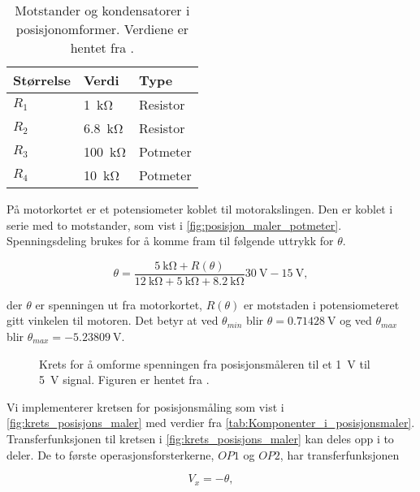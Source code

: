 \begin{table}[h]
    \centering
    \caption{Motstander og kondensatorer i posisjonomformer. Verdiene er hentet fra \cite{AnalogMotorlabbOppgaver}.}
    \begin{tabular}{lll}
        \toprule
        Størrelse & Verdi & Type \\
		\midrule
        $R_1$ & \SI{1}{\kilo\ohm} & Resistor\\
        $R_2$ & \SI{6.8}{\kilo\ohm} & Resistor \\
        $R_3$ & \SI{100}{\kilo\ohm} & Potmeter \\
        $R_4$ & \SI{10}{\kilo\ohm} & Potmeter \\
        \bottomrule
    \end{tabular}
    \label{tab:Komponenter_i_posisjonsmaler}
\end{table}

På motorkortet er et potensiometer koblet til motorakslingen. Den er koblet i serie med to motstander, som vist i \autoref{fig:posisjon_maler_potmeter}. Spenningsdeling brukes for å komme fram til følgende uttrykk for $\theta$.

\begin{equation}
    \label{eq:V_av_theta}
    \theta = \frac{\SI{5}{\kilo\ohm} + R(\theta)}{\SI{12}{\kilo\ohm} + \SI{5}{\kilo\ohm} + \SI{8.2}{\kilo\ohm}} \SI{30}{\volt} - \SI{15}{\volt},
\end{equation}

der $\theta$ er spenningen ut fra motorkortet, $R(\theta)$ er motstaden i potensiometeret gitt vinkelen til motoren. Det betyr at ved $\theta_{min}$ blir $\theta = \SI{0.71428}{\volt}$ og ved $\theta_{max}$ blir $\theta_{max} =\SI{-5.23809}{\volt}$.

\begin{figure}[h]
    \centering
    
    \caption{Krets for å omforme spenningen fra posisjonsmåleren til et \SI{1}{\volt} til \SI{5}{\volt} signal. Figuren er hentet fra \cite{AnalogMotorlabbOppgaver}.}
    \label{fig:krets_posisjons_maler}
\end{figure}

Vi implementerer kretsen for posisjonsmåling som vist i \autoref{fig:krets_posisjons_maler} med verdier fra \autoref{tab:Komponenter_i_posisjonsmaler}.
Transferfunksjonen til kretsen i \autoref{fig:krets_posisjons_maler} kan deles opp i to deler. De to første operasjonsforsterkerne, $OP1$ og $OP2$, har transferfunksjonen

\begin{equation}
    \label{eq:posisjon_maler_deltransferfunksjon}
    V_x = -\theta,
\end{equation}

